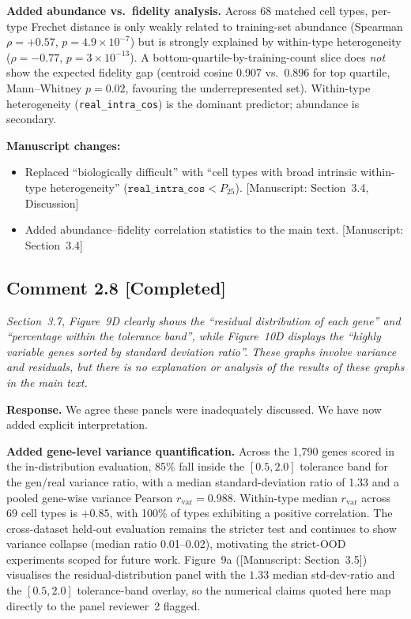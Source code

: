 \documentclass[11pt,letterpaper]{article}
\newcommand{\statuscompleted}{\textcolor{statusgreen}{\textbf{[Completed]}}}
\newcommand{\msref}[1]{\textcolor{blue!60!black}{\textsf{[Manuscript: #1]}}}
\begin{document}
\begin{revisionupdate}
\textbf{Added abundance vs.\ fidelity analysis.}
Across 68 matched cell types, per-type Frechet distance is only weakly related to training-set abundance (Spearman $\rho = +0.57$, $p = 4.9 \times 10^{-7}$) but is strongly explained by within-type heterogeneity ($\rho = -0.77$, $p = 3 \times 10^{-13}$). A bottom-quartile-by-training-count slice does \emph{not} show the expected fidelity gap (centroid cosine 0.907 vs.\ 0.896 for top quartile, Mann--Whitney $p = 0.02$, favouring the underrepresented set). Within-type heterogeneity (\texttt{real\_intra\_cos}) is the dominant predictor; abundance is secondary.
\end{revisionupdate}

\noindent\textbf{Manuscript changes:}
\begin{itemize}
  \item Replaced ``biologically difficult'' with ``cell types with broad intrinsic within-type heterogeneity'' ($\texttt{real\_intra\_cos} < P_{25}$). \msref{Section~3.4, Discussion}
  \item Added abundance--fidelity correlation statistics to the main text. \msref{Section~3.4}
\end{itemize}

\medskip

\subsection*{Comment 2.8 \hfill \statuscompleted}

\begin{reviewercomment}
\itshape
Section~3.7, Figure~9D clearly shows the ``residual distribution of each gene'' and ``percentage within the tolerance band'', while Figure~10D displays the ``highly variable genes sorted by standard deviation ratio''. These graphs involve variance and residuals, but there is no explanation or analysis of the results of these graphs in the main text.
\end{reviewercomment}

\noindent\textbf{Response.}
We agree these panels were inadequately discussed. We have now added explicit interpretation.

\begin{revisionupdate}
\textbf{Added gene-level variance quantification.}
Across the 1,790 genes scored in the in-distribution evaluation, 85\% fall inside the $[0.5, 2.0]$ tolerance band for the gen/real variance ratio, with a median standard-deviation ratio of 1.33 and a pooled gene-wise variance Pearson $r_\text{var} = 0.988$. Within-type median $r_\text{var}$ across 69 cell types is $+0.85$, with 100\% of types exhibiting a positive correlation. The cross-dataset held-out evaluation remains the stricter test and continues to show variance collapse (median ratio 0.01--0.02), motivating the strict-OOD experiments scoped for future work. Figure~9a (\msref{Section~3.5}) visualises the residual-distribution panel with the $1.33$ median std-dev-ratio and the $[0.5, 2.0]$ tolerance-band overlay, so the numerical claims quoted here map directly to the panel reviewer~2 flagged.
\end{revisionupdate}
\end{document}
